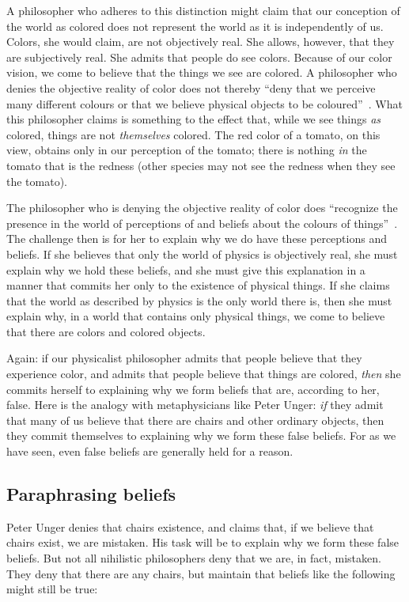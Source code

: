\documentclass[11pt]{standalone}
\begin{document}
\begin{spacing}{1.5}

A philosopher who adheres to this distinction might claim that our
conception of the world as colored does not represent the world as it
is independently of us.  Colors, she would claim, are not objectively
real.  She allows, however, that they are subjectively real.  She
admits that people do see colors.  Because of our color vision, we
come to believe that the things we see are colored.  A philosopher who
denies the objective reality of color does not thereby ``deny that we
perceive many different colours or that we believe physical objects to
be coloured''~\citep[145]{stroud2000a}.  What this philosopher claims
is something to the effect that, while we see things {\em as} colored,
things are not {\em themselves} colored.  The red color of a tomato,
on this view, obtains only in our perception of the tomato; there is
nothing {\em in} the tomato that is the redness (other species may not
see the redness when they see the tomato).

The philosopher who is denying the objective reality of color does
``recognize the presence in the world of perceptions of and beliefs
about the colours of things''~\citep[199]{stroud2000a}.  The challenge
then is for her to explain why we do have these perceptions and
beliefs.  If she believes that only the world of physics is
objectively real, she must explain why we hold these beliefs, and she
must give this explanation in a manner that commits her only to the
existence of physical things.  If she claims that the world as
described by physics is the only world there is, then she must explain
why, in a world that contains only physical things, we come to believe
that there are colors and colored objects.

Again: if our physicalist philosopher admits that people believe that
they experience color, and admits that people believe that things are
colored, {\em then} she commits herself to explaining why we form
beliefs that are, according to her, false.  Here is the analogy with
metaphysicians like Peter Unger: {\em if} they admit that many of us
believe that there are chairs and other ordinary objects, then they
commit themselves to explaining why we form these false beliefs.  For
as we have seen, even false beliefs are generally held for a reason.

\subsection{Paraphrasing beliefs}
\label{paraphrase}
Peter Unger denies that chairs existence, and claims that, if we
believe that chairs exist, we are mistaken.  His task will be to
explain why we form these false beliefs.  But not all nihilistic
philosophers deny that we are, in fact, mistaken.  They deny that
there are any chairs, but maintain that beliefs like the following
might still be true:


\end{spacing}
\end{document}
